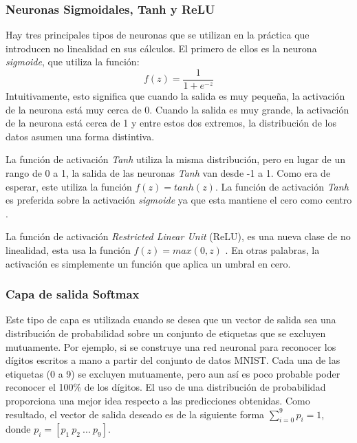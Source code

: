     \subsubsection{Neuronas Sigmoidales, Tanh y ReLU}

    Hay tres principales tipos de neuronas que se utilizan en la práctica que introducen no linealidad en sus cálculos. El primero de ellos es la neurona \textit{sigmoide}, que utiliza la función:
    \begin{equation}
        f(z)=\frac{1}{1+e^{-z}}
    \end{equation}
    Intuitivamente, esto significa que cuando la salida es muy pequeña, la activación de la neurona está muy cerca de 0. Cuando la salida es muy grande, la activación de la neurona está cerca de 1 y entre estos dos extremos, la distribución de los datos asumen una forma distintiva.
  

    La función de activación \textit{Tanh} utiliza la misma distribución, pero en lugar de un rango de 0 a 1, la salida de las neuronas \textit{Tanh} van desde -1 a 1. Como era de esperar, este utiliza la función $f(z)=tanh(z)$. La función de activación \textit{Tanh} es preferida sobre la activación \textit{sigmoide} ya que esta mantiene el cero como centro \cite{dlBook}.
 
    La función de activación \textit{Restricted Linear Unit} (ReLU), es una nueva clase de no linealidad, esta usa la función $f(z)=max(0,z)$ \cite{dlBook}. En otras palabras, la activación es simplemente un función que aplica un umbral en cero.
 

    \subsubsection{Capa de salida Softmax}

    Este tipo de capa es utilizada cuando se desea que un vector de salida sea una distribución de probabilidad sobre un conjunto de etiquetas que se excluyen mutuamente. Por ejemplo, si se construye una red neuronal para reconocer los dígitos escritos a mano a partir del conjunto de datos MNIST. Cada una de las etiquetas (0 a 9) se excluyen mutuamente, pero aun así es poco probable poder reconocer el 100\% de los dígitos. El uso de una distribución de probabilidad proporciona una mejor idea respecto a las predicciones obtenidas. Como resultado, el vector de salida deseado es de la siguiente forma $\sum_{i=0}^9 p_i=1$, donde $p_i=[p_1\ p_2\ ...\ p_9]$.

